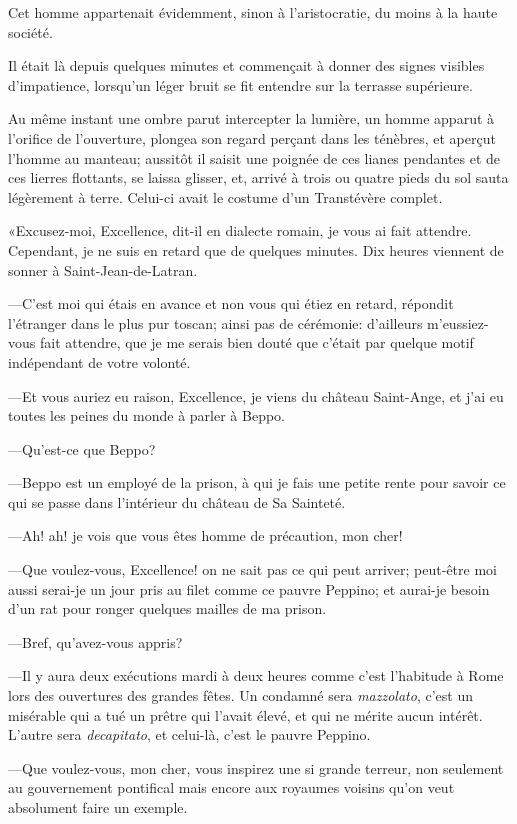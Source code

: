 Cet homme appartenait évidemment, sinon à l'aristocratie, du moins à la haute société. 

Il était là depuis quelques minutes et commençait à donner des signes visibles d'impatience, lorsqu'un léger bruit se fit entendre sur la terrasse supérieure. 

Au même instant une ombre parut intercepter la lumière, un homme apparut à l'orifice de l'ouverture, plongea son regard perçant dans les ténèbres, et aperçut l'homme au manteau; aussitôt il saisit une poignée de ces lianes pendantes et de ces lierres flottants, se laissa glisser, et, arrivé à trois ou quatre pieds du sol sauta légèrement à terre. Celui-ci avait le costume d'un Transtévère complet. 

«Excusez-moi, Excellence, dit-il en dialecte romain, je vous ai fait attendre. Cependant, je ne suis en retard que de quelques minutes. Dix heures viennent de sonner à Saint-Jean-de-Latran. 

—C'est moi qui étais en avance et non vous qui étiez en retard, répondit l'étranger dans le plus pur toscan; ainsi pas de cérémonie: d'ailleurs m'eussiez-vous fait attendre, que je me serais bien douté que c'était par quelque motif indépendant de votre volonté. 

—Et vous auriez eu raison, Excellence, je viens du château Saint-Ange, et j'ai eu toutes les peines du monde à parler à Beppo. 

—Qu'est-ce que Beppo? 

—Beppo est un employé de la prison, à qui je fais une petite rente pour savoir ce qui se passe dans l'intérieur du château de Sa Sainteté. 

—Ah! ah! je vois que vous êtes homme de précaution, mon cher! 

—Que voulez-vous, Excellence! on ne sait pas ce qui peut arriver; peut-être moi aussi serai-je un jour pris au filet comme ce pauvre Peppino; et aurai-je besoin d'un rat pour ronger quelques mailles de ma prison. 

—Bref, qu'avez-vous appris? 

—Il y aura deux exécutions mardi à deux heures comme c'est l'habitude à Rome lors des ouvertures des grandes fêtes. Un condamné sera \textit{mazzolato}, c'est un misérable qui a tué un prêtre qui l'avait élevé, et qui ne mérite aucun intérêt. L'autre sera \textit{decapitato}, et celui-là, c'est le pauvre Peppino. 

—Que voulez-vous, mon cher, vous inspirez une si grande terreur, non seulement au gouvernement pontifical mais encore aux royaumes voisins qu'on veut absolument faire un exemple. 

